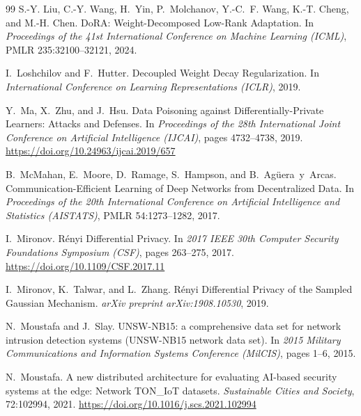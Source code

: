 \begin{thebibliography}{99}
S.-Y. Liu, C.-Y. Wang, H.~Yin, P.~Molchanov, Y.-C.~F. Wang, K.-T. Cheng, and M.-H. Chen.
\newblock DoRA: Weight-Decomposed Low-Rank Adaptation.
\newblock In \emph{Proceedings of the 41st International Conference on Machine Learning (ICML)}, PMLR 235:32100--32121, 2024.

I.~Loshchilov and F.~Hutter.
\newblock Decoupled Weight Decay Regularization.
\newblock In \emph{International Conference on Learning Representations (ICLR)}, 2019.

Y.~Ma, X.~Zhu, and J.~Hsu.
\newblock Data Poisoning against Differentially-Private Learners: Attacks and Defenses.
\newblock In \emph{Proceedings of the 28th International Joint Conference on Artificial Intelligence (IJCAI)}, pages 4732--4738, 2019.
\newblock \url{https://doi.org/10.24963/ijcai.2019/657}

B.~McMahan, E.~Moore, D.~Ramage, S.~Hampson, and B.~Ag{\"u}era~y~Arcas.
\newblock Communication-Efficient Learning of Deep Networks from Decentralized Data.
\newblock In \emph{Proceedings of the 20th International Conference on Artificial Intelligence and Statistics (AISTATS)}, PMLR 54:1273--1282, 2017.

I.~Mironov.
\newblock R{\'e}nyi Differential Privacy.
\newblock In \emph{2017 IEEE 30th Computer Security Foundations Symposium (CSF)}, pages 263--275, 2017.
\newblock \url{https://doi.org/10.1109/CSF.2017.11}

I.~Mironov, K.~Talwar, and L.~Zhang.
\newblock R{\'e}nyi Differential Privacy of the Sampled Gaussian Mechanism.
\newblock \emph{arXiv preprint arXiv:1908.10530}, 2019.

N.~Moustafa and J.~Slay.
\newblock UNSW-NB15: a comprehensive data set for network intrusion detection systems (UNSW-NB15 network data set).
\newblock In \emph{2015 Military Communications and Information Systems Conference (MilCIS)}, pages 1--6, 2015.

N.~Moustafa.
\newblock A new distributed architecture for evaluating AI-based security systems at the edge: Network TON\_IoT datasets.
\newblock \emph{Sustainable Cities and Society}, 72:102994, 2021.
\newblock \url{https://doi.org/10.1016/j.scs.2021.102994}


\end{thebibliography}
